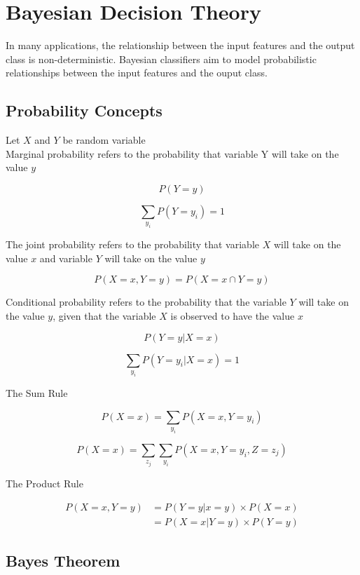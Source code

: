 \chapter{Bayesian Decision Theory}

\begin{multicols*}{2}
\noindent In many applications, the relationship between the input features and the output class is non-deterministic. Bayesian classifiers aim to model probabilistic relationships between the input features and the ouput class. 

\section{Probability Concepts}

\noindent Let $X$ and $Y$ be random variable \\

\noindent Marginal probability refers to the probability that variable Y will take on the value $y$

$$P(Y = y)$$

$$\sum_{y_{i}} P(Y = y_{i}) = 1$$

\noindent The joint probability refers to the probability that variable $X$ will take on the value $x$ and variable $Y$ will take on the value $y$

$$P(X=x, Y=y) = P(X=x \cap Y=y)$$

\noindent Conditional probability refers to the probability that the variable $Y$ will take on the value $y$, given that the variable $X$ is observed to have the value $x$

$$P( Y=y | X=x )$$

$$\sum_{y_{i}} P(Y=y_{i} | X=x) = 1$$

\noindent The Sum Rule

$$P(X=x) = \sum_{y_{i}} P(X=x , Y=y_{i})$$

$$P(X=x) = \sum_{z_{j}} \sum_{y_{i}} P(X=x , Y=y_{i}, Z=z_{j})$$

\noindent The Product Rule

\begin{equation*}
\begin{split}
    P(X=x,Y=y) &= P(Y=y|x=y) \times P(X=x)\\
    &= P(X=x|Y=y) \times P(Y=y)
\end{split}
\end{equation*}

\section{Bayes Theorem}


\end{multicols*}
